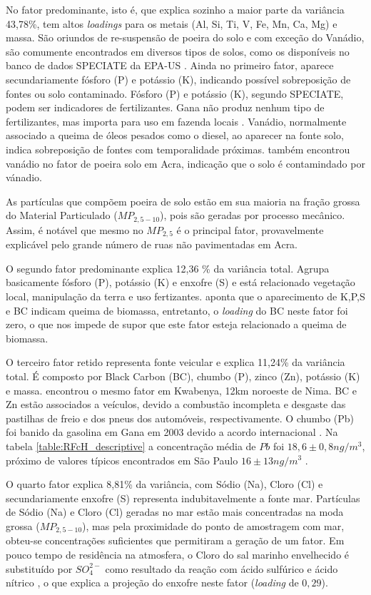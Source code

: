 No fator predominante, isto é, que explica sozinho a maior parte da variância 
43,78\%, tem altos \textit{loadings} para os metais (Al, Si, Ti, V, Fe, Mn, Ca, 
Mg) e massa. São oriundos de re-suspensão de poeira do solo e com exceção do 
Vanádio, são comumente encontrados em diversos tipos de solos, 
como os disponíveis no banco de dados SPECIATE da EPA-US \citep{simon2010}.
Ainda no primeiro fator, aparece secundariamente fósforo (P) e potássio (K), 
indicando possível sobreposição de fontes ou solo contaminado. 
Fósforo (P) e potássio (K), segundo SPECIATE, podem ser indicadores de 
fertilizantes. Gana não produz nenhum tipo de fertilizantes, mas importa para 
uso em fazenda locais \citep{fianko2011}. 
Vanádio, normalmente associado a queima de óleos pesados como o diesel, ao 
aparecer na fonte solo, indica sobreposição de fontes com temporalidade próximas.
\citet{aboh2009} também encontrou vanádio no fator de poeira solo em Acra, 
indicação que o solo é contamindado por vánadio.

As partículas que compõem poeira de solo estão em sua maioria na fração
grossa do Material Particulado ($MP_{2,5-10}$), pois são geradas por processo 
mecânico. Assim, é notável que mesmo no $MP_{2,5}$ é o principal fator, 
provavelmente explicável pelo grande número de ruas não pavimentadas em Acra. 

O segundo fator predominante explica 12,36 \% da variância total. 
Agrupa basicamente fósforo (P), potássio (K) e enxofre (S) e está relacionado
vegetação local, manipulação da terra e uso fertizantes. 
\citet{reid2005} aponta que o aparecimento de K,P,S e BC indicam queima de
biomassa, entretanto, o \textit{loading} do BC neste fator foi zero, o que nos
impede de supor que este fator esteja relacionado a queima de biomassa. 

O terceiro fator retido representa fonte veicular e explica 11,24\% da variância
total. É composto por Black Carbon (BC), chumbo (P), zinco (Zn), potássio (K) e 
massa. \citet{aboh2009} encontrou o mesmo fator em Kwabenya, 12km noroeste de 
Nima. BC e Zn estão associados a veículos, devido a combustão 
incompleta e desgaste das pastilhas de freio e dos pneus dos automóveis, 
respectivamente. O chumbo (Pb) foi banido da gasolina em Gana em 2003 devido 
a acordo internacional \citep{epa2015}.  
Na tabela \ref{table:RFcH_descriptive} a concentração média de $Pb$ 
foi $18,6 \pm 0,8 n g /m^3$, próximo de valores típicos encontrados em São Paulo 
$16 \pm 13 n g /m^3$ \citep{andrade2012}.

O quarto fator explica 8,81\% da variância, com Sódio (Na), Cloro (Cl) e
secundariamente enxofre (S) representa indubitavelmente a fonte mar. 
Partículas de Sódio (Na) e Cloro (Cl) geradas no mar estão mais concentradas 
na moda grossa ($MP_{2,5-10}$), mas pela proximidade do ponto de amostragem 
com mar, obteu-se concentrações suficientes que permitiram a geração de um fator. 
Em pouco tempo de residência na atmosfera, o Cloro do sal marinho envelhecido 
é substituído por $SO_4^{2-}$ como resultado da reação com ácido sulfúrico e 
ácido nítrico \citep{mcinnes1994}, o que explica a projeção do enxofre neste
fator (\textit{loading} de $0,29$).

